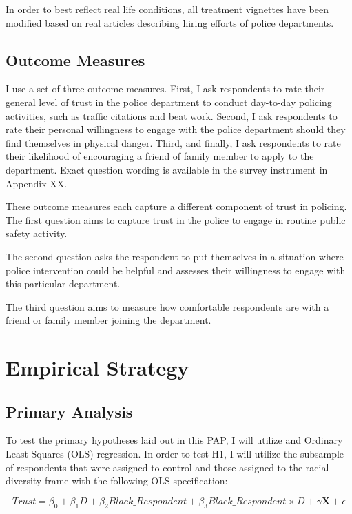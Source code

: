 \documentclass[12pt]{article}
\begin{document}
In order to best reflect real life conditions, all treatment vignettes have been modified based on real articles describing hiring efforts of police departments. 

\subsection{Outcome Measures}

I use a set of three outcome measures. First, I ask respondents to rate their general level of trust in the police department to conduct day-to-day policing activities, such as traffic citations and beat work. Second, I ask respondents to rate their personal willingness to engage with the police department should they find themselves in physical danger. Third, and finally, I ask respondents to rate their likelihood of encouraging a friend of family member to apply to the department. Exact question wording is available in the survey instrument in Appendix XX.

These outcome measures each capture a different component of trust in policing. The first question aims to capture trust in the police to engage in routine public safety activity. 

The second question asks the respondent to put themselves in a situation where police intervention could be helpful and assesses their willingness to engage with this particular department. 

The third question aims to measure how comfortable respondents are with a friend or family member joining the department. 

\section{Empirical Strategy}

\subsection{Primary Analysis}

To test the primary hypotheses laid out in this PAP, I will utilize and Ordinary Least Squares (OLS) regression. In order to test H1, I will utilize the subsample of respondents that were assigned to control and those assigned to the racial diversity frame with the following OLS specification:

\begin{equation}
    Trust = \beta_0 + \beta_1 D + \beta_2 Black\_Respondent +  \beta_3 Black\_Respondent\times D  + \gamma \mathbf{X} + \epsilon
\end{equation}\label{eq:h1}
\end{document}
